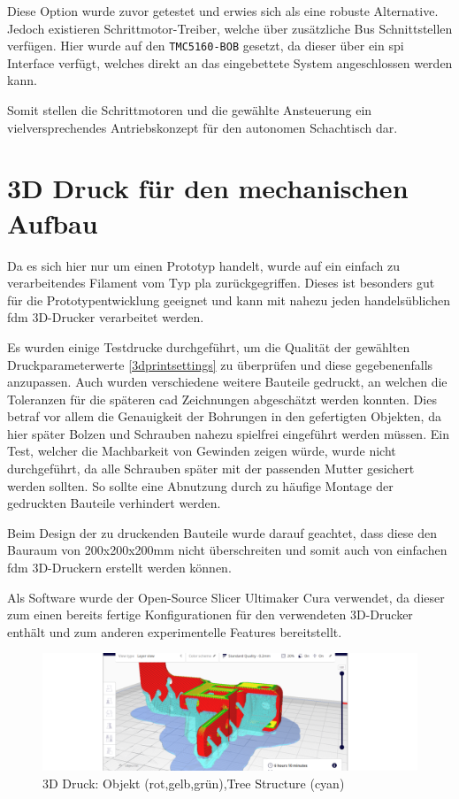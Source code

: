 Diese Option wurde zuvor getestet und erwies sich als eine robuste
Alternative. Jedoch existieren Schrittmotor-Treiber, welche über
zusätzliche Bus Schnittstellen verfügen. Hier wurde auf den
\passthrough{\lstinline!TMC5160-BOB!} gesetzt, da dieser über ein
\gls{spi} Interface verfügt, welches direkt an das eingebettete System
angeschlossen werden kann.

Somit stellen die Schrittmotoren und die gewählte Ansteuerung ein
vielversprechendes Antriebskonzept für den autonomen Schachtisch dar.

\hypertarget{d-druck-fuxfcr-den-mechanischen-aufbau}{%
\section{3D Druck für den mechanischen
Aufbau}\label{d-druck-fuxfcr-den-mechanischen-aufbau}}

Da es sich hier nur um einen Prototyp handelt, wurde auf ein einfach zu
verarbeitendes Filament vom Typ \gls{pla} zurückgegriffen. Dieses ist
besonders gut für die Prototypentwicklung geeignet und kann mit nahezu
jeden handelsüblichen \gls{fdm} 3D-Drucker verarbeitet werden.

Es wurden einige Testdrucke durchgeführt, um die Qualität der gewählten
Druckparameterwerte \ref{3dprintsettings} zu überprüfen und diese
gegebenenfalls anzupassen. Auch wurden verschiedene weitere Bauteile
gedruckt, an welchen die Toleranzen für die späteren \gls{cad}
Zeichnungen abgeschätzt werden konnten. Dies betraf vor allem die
Genauigkeit der Bohrungen in den gefertigten Objekten, da hier später
Bolzen und Schrauben nahezu spielfrei eingeführt werden müssen. Ein
Test, welcher die Machbarkeit von Gewinden zeigen würde, wurde nicht
durchgeführt, da alle Schrauben später mit der passenden Mutter
gesichert werden sollten. So sollte eine Abnutzung durch zu häufige
Montage der gedruckten Bauteile verhindert werden.

Beim Design der zu druckenden Bauteile wurde darauf geachtet, dass diese
den Bauraum von 200x200x200mm nicht überschreiten und somit auch von
einfachen \gls{fdm} 3D-Druckern erstellt werden können.

Als Software wurde der Open-Source Slicer Ultimaker Cura
\cite{ultimakercura} verwendet, da dieser zum einen bereits fertige
Konfigurationen für den verwendeten 3D-Drucker enthält und zum anderen
experimentelle Features bereitstellt.

\begin{figure}
\centering
\includegraphics{images/3d_print_tree_structure.png}
\caption{3D Druck: Objekt (rot,gelb,grün),Tree Structure (cyan)
\label{3d_print_tree_structure}}
\end{figure}

